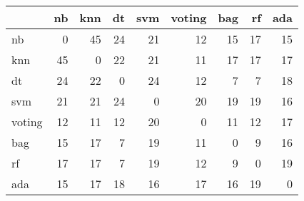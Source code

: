 \begin{tabular}{lrrrrrrrr}
\toprule
{} &  nb &  knn &  dt &  svm &  voting &  bag &  rf &  ada \\
\midrule
nb     &   0 &   45 &  24 &   21 &      12 &   15 &  17 &   15 \\
knn    &  45 &    0 &  22 &   21 &      11 &   17 &  17 &   17 \\
dt     &  24 &   22 &   0 &   24 &      12 &    7 &   7 &   18 \\
svm    &  21 &   21 &  24 &    0 &      20 &   19 &  19 &   16 \\
voting &  12 &   11 &  12 &   20 &       0 &   11 &  12 &   17 \\
bag    &  15 &   17 &   7 &   19 &      11 &    0 &   9 &   16 \\
rf     &  17 &   17 &   7 &   19 &      12 &    9 &   0 &   19 \\
ada    &  15 &   17 &  18 &   16 &      17 &   16 &  19 &    0 \\
\bottomrule
\end{tabular}
